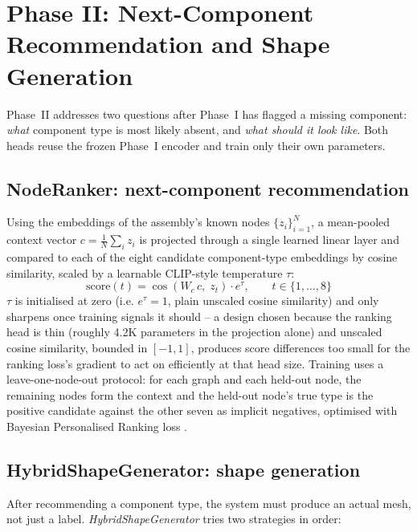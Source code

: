 \documentclass[sn-mathphys,Numbered]{sn-jnl}
\begin{document}
\section{Phase II: Next-Component Recommendation and Shape Generation}\label{sec:phase2}

Phase~II addresses two questions after Phase~I has flagged a missing component: \emph{what} component type is most likely absent, and \emph{what should it look like}. Both heads reuse the frozen Phase~I encoder and train only their own parameters.

\subsection{NodeRanker: next-component recommendation}\label{sec:noderanker}

Using the embeddings of the assembly's known nodes $\{z_i\}_{i=1}^{N}$, a mean-pooled context vector $c = \frac{1}{N}\sum_i z_i$ is projected through a single learned linear layer and compared to each of the eight candidate component-type embeddings by cosine similarity, scaled by a learnable CLIP-style temperature $\tau$:
\begin{equation}
\text{score}(t) = \cos\!\left(W_c\, c,\; z_t\right) \cdot e^{\tau}, \qquad t \in \{1,\dots,8\}
\label{eq:rankerscore}
\end{equation}
$\tau$ is initialised at zero (i.e. $e^{\tau}=1$, plain unscaled cosine similarity) and only sharpens once training signals it should -- a design chosen because the ranking head is thin (roughly 4.2K parameters in the projection alone) and unscaled cosine similarity, bounded in $[-1,1]$, produces score differences too small for the ranking loss's gradient to act on efficiently at that head size. Training uses a leave-one-node-out protocol: for each graph and each held-out node, the remaining nodes form the context and the held-out node's true type is the positive candidate against the other seven as implicit negatives, optimised with Bayesian Personalised Ranking loss \cite{rendle2009bpr}.

\subsection{HybridShapeGenerator: shape generation}\label{sec:shapegen}

After recommending a component type, the system must produce an actual mesh, not just a label. \textit{HybridShapeGenerator} tries two strategies in order:
\end{document}
